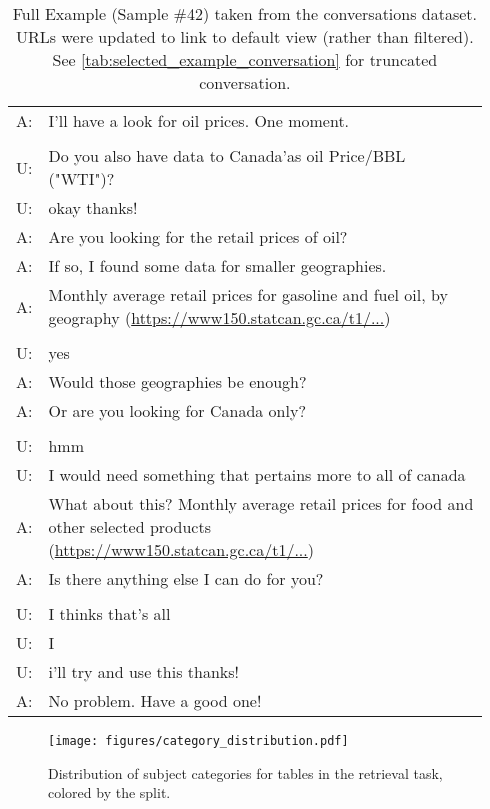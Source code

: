 \documentclass[11pt]{article}
\begin{document}
\begin{table*}[h]
\begin{tabular}{l p{0.94\linewidth}}
    A: & I'll have a look for oil prices. One moment.\\
    \\
    U: & Do you also have data to Canada'as oil Price/BBL ("WTI")?\\
    U: & okay thanks!\\
    A: & Are you looking for the retail prices of oil?\\
    A: & If so, I found some data for smaller geographies.\\
    A: & Monthly average retail prices for gasoline and fuel oil, by geography (\href{https://www150.statcan.gc.ca/t1/tbl1/en/cv.action?pid=1810000101}{https://www150.statcan.gc.ca/t1/...})\\
    \\
    U: & yes\\
    A: & Would those geographies be enough?\\
    A: & Or are you looking for Canada only?\\
    \\
    U: & hmm\\
    U: & I would need something that pertains more to all of canada\\
    A: & What about this? Monthly average retail prices for food and other selected products (\href{https://www150.statcan.gc.ca/t1/tbl1/en/cv.action?pid=1810000201}{https://www150.statcan.gc.ca/t1/...})\\
    A: & Is there anything else I can do for you?\\
    \\
    U: & I thinks that's all\\
    U: & I\\
    U: & i'll try and use this thanks!\\
    A: & No problem. Have a good one!\\
    \hline
    \end{tabular}
    \caption{Full Example (Sample \#42) taken from the conversations dataset. URLs were updated to link to default view (rather than filtered). See \autoref{tab:selected_example_conversation} for truncated conversation.}
    \label{tab:full_example_conversation}
\end{table*}


\begin{figure*}[h]
    \small
    \centering
    \texttt{[image: figures/category\_distribution.pdf]}
    \caption{Distribution of subject categories for tables in the retrieval task, colored by the split.}
    \label{fig:category_distribution}
\end{figure*}
\end{document}
